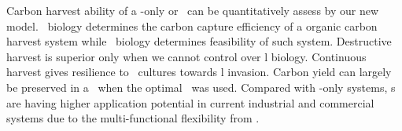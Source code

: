 \documentclass[../thesis.tex]{subfiles} %
\begin{document}
Carbon harvest ability of a \phy-only or \pbs\ can be quantitatively assess by our new model.  \Phy\ biology determines the carbon capture efficiency of a organic carbon harvest system while \bac\ biology determines feasibility of such system.  Destructive harvest is superior only when we cannot control over \bac l biology.  Continuous harvest gives resilience to \phy\ cultures towards \bac l invasion.  Carbon yield can largely be preserved in a \pbs\ when the optimal \bac\ was used.  Compared with \phy-only systems, \pbs s are having higher application potential in current industrial and commercial systems due to the multi-functional flexibility from \bac.
\end{document}
